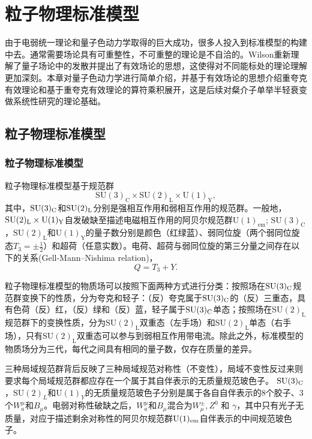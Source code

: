 \chapter{粒子物理标准模型}
由于电弱统一理论和量子色动力学取得的巨大成功，很多人投入到标准模型的构建中去。通常需要场论具有可重整性，不可重整的理论是不自洽的。Wilson重新理解了量子场论中的发散并提出了有效场论的思想，这使得对不同能标处的理论理解更加深刻。本章对量子色动力学进行简单介绍，并基于有效场论的思想介绍重夸克有效理论和基于重夸克有效理论的算符乘积展开，这是后续对粲介子单举半轻衰变做系统性研究的理论基础。

\section{粒子物理标准模型}
\subsection{粒子物理标准模型}
粒子物理标准模型基于规范群
\begin{equation}
    \mathrm{SU}(3)_{\mathrm{C}} \times \mathrm{SU}(2)_{\mathrm{L}} \times \mathrm{U}(1)_{\mathrm{Y}},
\end{equation}
其中，$\mathrm{SU}(3)_{\mathrm{C}}$和$\mathrm{SU}(2)_{\mathrm{L}} $分别是强相互作用和弱相互作用的规范群。一般地，$\mathrm{SU}(2)_{\mathrm{L}} \times \mathrm{U}(1)_{\mathrm{Y}}$自发破缺至描述电磁相互作用的阿贝尔规范群$\mathrm{U(1)_{em}}$; $\mathrm{SU(3)_C}$，$\mathrm{SU(2)_L}$和$\mathrm{U(1)_Y}$的量子数分别是颜色（红绿蓝）、弱同位旋（两个弱同位旋态$T_{3}=\pm\frac{1}{2}$）和超荷（任意实数）。电荷、超荷与弱同位旋的第三分量之间存在以下的关系(Gell-Mann–Nishima relation)，
\begin{equation}
    Q=T_3+Y.
\end{equation}

粒子物理标准模型的物质场可以按照下面两种方式进行分类：按照场在$\mathrm{SU}(3)_{\mathrm{C}}$规范群变换下的性质，分为夸克和轻子：（反）夸克属于$\mathrm{SU}(3)_{\mathrm{C}}$的（反）三重态，具有色荷（反）红，（反）绿和（反）蓝，轻子属于$\mathrm{SU}(3)_{\mathrm{C}}$单态；按照场在$\mathrm{SU(2)_L}$规范群下的变换性质，分为$\mathrm{SU(2)_L}$双重态（左手场）和$\mathrm{SU(2)_L}$单态（右手场），只有$\mathrm{SU(2)_L}$双重态可以参与到弱相互作用带电流。除此之外，标准模型的物质场分为三代，每代之间具有相同的量子数，仅存在质量的差异。

三种局域规范群背后反映了三种局域规范对称性（不变性），局域不变性反过来则要求每个局域规范群都应存在一个属于其自伴表示的无质量规范玻色子。 $\mathrm{SU}(3)_{\mathrm{C}}$，$\mathrm{SU}(2)_L$和$\mathrm{U}(1)_Y$的无质量规范玻色子分别是属于各自自伴表示的8个胶子、3个$W_{a}^{\mu}$和$B_{\mu}$。电弱对称性破缺之后，$W_{a}^{\mu}$和$B_{\mu}$混合为$W_\mu^{ \pm}, Z^0$ 和 $\gamma$，其中只有光子无质量，对应于描述剩余对称性的阿贝尔规范群$\mathrm{U}(1)_{\mathrm{em}}$自伴表示的中间规范玻色子。

